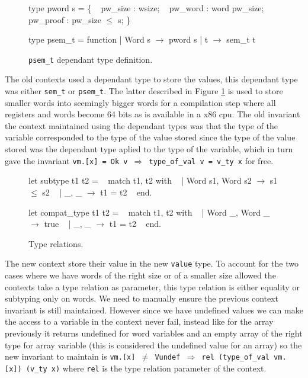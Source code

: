 \documentclass{article}
\begin{document}
\medskip

\begin{figure}
\obeylines\obeyspaces\ttfamily%
type pword s = \{
~ pw\_size  : wsize;
~ pw\_word  : word pw\_size;
~ pw\_proof : pw\_size \(\leq\) s;
\}

type psem\_t = function
| Word s \(\rightarrow\) pword s
| t      \(\rightarrow\) sem\_t t
\normalfont%
\caption{\texttt{psem\_t} dependant type definition.}\label{fig:psemt}
\end{figure}

The old contexts used a dependant type to store the values, this dependant type
was either \texttt{sem\_t} or \texttt{psem\_t}. The latter described in Figure
\ref{fig:psemt} is used to store smaller words into seemingly bigger words for
a compilation step where all registers and words become 64 bits as is available
in a x86 cpu. The old invariant the context maintained using the dependant types
was that the type of the variable corresponded to the type of the value stored
since the type of the value stored was the dependant type aplied to the type of
the variable, which in turn gave the invariant
\texttt{vm.[x] = Ok v \(\Longrightarrow\) type\_of\_val v = v\_ty x} for free.

\begin{figure}[t]
\obeylines\obeyspaces\ttfamily%
let subtype t1 t2 =
~ match t1, t2 with
~ | Word s1, Word s2 \(\rightarrow\) s1 \(\leq\) s2
~ | \_,       \_       \(\rightarrow\) t1 = t2
~ end.

let compat\_type t1 t2 =
~ match t1, t2 with
~ | Word \_, Word \_ \(\rightarrow\) true
~ | \_,      \_      \(\rightarrow\) t1 = t2
~ end.
\normalfont%
\caption{Type relations.}
\end{figure}

The new context store their value in the new \texttt{value} type. To account for
the two cases where we have words of the right size or of a smaller size allowed
the contexts take a type relation as parameter, this type relation is either
equality or subtyping only on words. We need to manually ensure the previous
context invariant is still maintained. However since we have undefined values we
can make the access to a variable in the context never fail, instead like for
the array previously it returns undefined for word variables and an empty array
of the right type for array variable (this is considered the undefined value for
an array) so the new invariant to maintain is
\texttt{vm.[x] \(\neq\) Vundef \(\Longrightarrow\) rel (type\_of\_val vm.[x]) (v\_ty x)}
where \texttt{rel} is the type relation parameter of the context.
\end{document}
